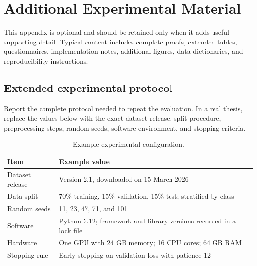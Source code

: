 
\chapter{Additional Experimental Material}\label{app:additional-material}

\begin{keypoint}
This appendix is optional and should be retained only when it adds useful
supporting detail. Typical content includes complete proofs, extended tables,
questionnaires, implementation notes, additional figures, data dictionaries,
and reproducibility instructions.
\end{keypoint}

\section{Extended experimental protocol}
Report the complete protocol needed to repeat the evaluation. In a real thesis,
replace the values below with the exact dataset release, split procedure,
preprocessing steps, random seeds, software environment, and stopping criteria.

\begin{table}[htbp]
\centering
\caption{Example experimental configuration.}
\label{tab:appendix-config}
\begin{tabularx}{\textwidth}{lY}
\toprule
Item & Example value\\
\midrule
Dataset release & Version 2.1, downloaded on 15 March 2026\\
Data split & 70\% training, 15\% validation, 15\% test; stratified by class\\
Random seeds & 11, 23, 47, 71, and 101\\
Software & Python 3.12; framework and library versions recorded in a lock file\\
Hardware & One GPU with 24 GB memory; 16 CPU cores; 64 GB RAM\\
Stopping rule & Early stopping on validation loss with patience 12\\
\bottomrule
\end{tabularx}
\end{table}

